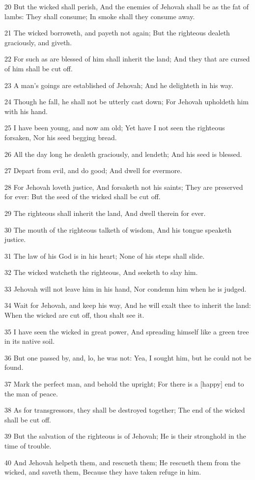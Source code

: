 \par 20 But the wicked shall perish, And the enemies of Jehovah shall be as the fat of lambs: They shall consume; In smoke shall they consume away.
\par 21 The wicked borroweth, and payeth not again; But the righteous dealeth graciously, and giveth.
\par 22 For such as are blessed of him shall inherit the land; And they that are cursed of him shall be cut off.
\par 23 A man's goings are established of Jehovah; And he delighteth in his way.
\par 24 Though he fall, he shall not be utterly cast down; For Jehovah upholdeth him with his hand.
\par 25 I have been young, and now am old; Yet have I not seen the righteous forsaken, Nor his seed begging bread.
\par 26 All the day long he dealeth graciously, and lendeth; And his seed is blessed.
\par 27 Depart from evil, and do good; And dwell for evermore.
\par 28 For Jehovah loveth justice, And forsaketh not his saints; They are preserved for ever: But the seed of the wicked shall be cut off.
\par 29 The righteous shall inherit the land, And dwell therein for ever.
\par 30 The mouth of the righteous talketh of wisdom, And his tongue speaketh justice.
\par 31 The law of his God is in his heart; None of his steps shall slide.
\par 32 The wicked watcheth the righteous, And seeketh to slay him.
\par 33 Jehovah will not leave him in his hand, Nor condemn him when he is judged.
\par 34 Wait for Jehovah, and keep his way, And he will exalt thee to inherit the land: When the wicked are cut off, thou shalt see it.
\par 35 I have seen the wicked in great power, And spreading himself like a green tree in its native soil.
\par 36 But one passed by, and, lo, he was not: Yea, I sought him, but he could not be found.
\par 37 Mark the perfect man, and behold the upright; For there is a [happy] end to the man of peace.
\par 38 As for transgressors, they shall be destroyed together; The end of the wicked shall be cut off.
\par 39 But the salvation of the righteous is of Jehovah; He is their stronghold in the time of trouble.
\par 40 And Jehovah helpeth them, and rescueth them; He rescueth them from the wicked, and saveth them, Because they have taken refuge in him.

